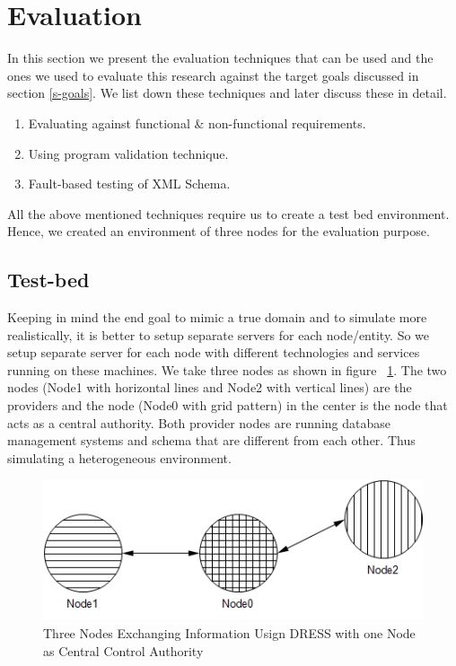 \documentclass[12pt,a4paper,oneside]{book}
\begin{document}
\section{Evaluation}
In this section we present the evaluation techniques that can be used and the ones we used to evaluate this research against the target goals discussed in section \ref{s-goals}. We list down these techniques and later discuss these in detail.

	\begin{enumerate}

	\item Evaluating against functional \& non-functional requirements.

	\item Using program validation technique. \cite{Sieve}
	
	\item Fault-based testing of XML Schema.
	
	

	\end{enumerate}
	
	All the above mentioned techniques require us to create a test bed environment. Hence, we created an environment of three nodes for the evaluation purpose. \\
	
	\subsection{Test-bed}
	Keeping in mind the end goal to mimic a true domain and to simulate more realistically, it is better to setup separate servers for each node/entity. So we setup separate server for each node with different technologies and services running on these machines. We take three nodes as shown in figure ~\ref{fig:testbed}. The two nodes (Node1 with horizontal lines and Node2 with vertical lines) are the providers and the node (Node0 with grid pattern) in the center is the node that acts as a central authority. Both provider nodes are running database management systems and schema that are different from each other. Thus simulating a heterogeneous environment.
	
\begin{figure}[!htp]
  \centering
  \includegraphics{architecture_distributed_testbed_exchange_through_hec.jpg}
  \caption{Three Nodes Exchanging Information Usign DRESS with one Node as Central Control Authority}
  \label{fig:testbed}
\end{figure}  
\end{document}
